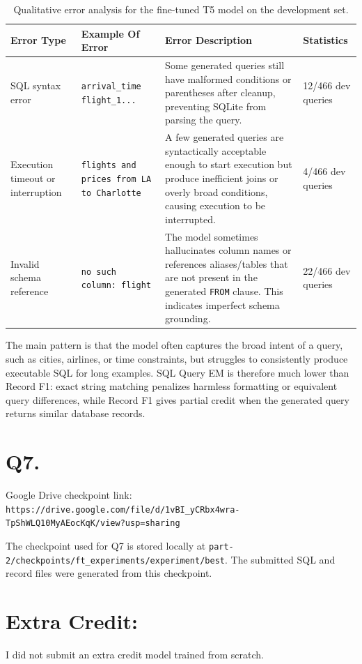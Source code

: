 \documentclass{article}
\begin{document}
\begin{table}[h!]
  \centering
  \begin{tabular}{p{2.5cm}p{3.4cm}p{4.4cm}p{3cm}}
    \toprule
    \textbf{Error Type} & \textbf{Example Of Error} & \textbf{Error Description} & \textbf{Statistics} \\
    \midrule
    SQL syntax error & \texttt{arrival\_time flight\_1...} & Some generated queries still have malformed conditions or parentheses after cleanup, preventing SQLite from parsing the query. & 12/466 dev queries \\
    Execution timeout or interruption & \texttt{flights and prices from LA to Charlotte} & A few generated queries are syntactically acceptable enough to start execution but produce inefficient joins or overly broad conditions, causing execution to be interrupted. & 4/466 dev queries \\
    Invalid schema reference & \texttt{no such column: flight} & The model sometimes hallucinates column names or references aliases/tables that are not present in the generated \texttt{FROM} clause. This indicates imperfect schema grounding. & 22/466 dev queries \\
    \bottomrule
  \end{tabular}
  \label{tab:qualitative}
  \caption{Qualitative error analysis for the fine-tuned T5 model on the development set.}
\end{table}

The main pattern is that the model often captures the broad intent of a query, such as cities, airlines, or time constraints, but struggles to consistently produce executable SQL for long examples. SQL Query EM is therefore much lower than Record F1: exact string matching penalizes harmless formatting or equivalent query differences, while Record F1 gives partial credit when the generated query returns similar database records.

\section*{Q7.}

Google Drive checkpoint link: \texttt{https://drive.google.com/file/d/1vBI\_yCRbx4wra-TpShWLQ10MyAEocKqK/view?usp=sharing}

The checkpoint used for Q7 is stored locally at
\texttt{part-2/checkpoints/ft\_experiments/experiment/best}. The submitted SQL and record files were generated from this checkpoint.

\section*{Extra Credit:}
I did not submit an extra credit model trained from scratch.
\end{document}
